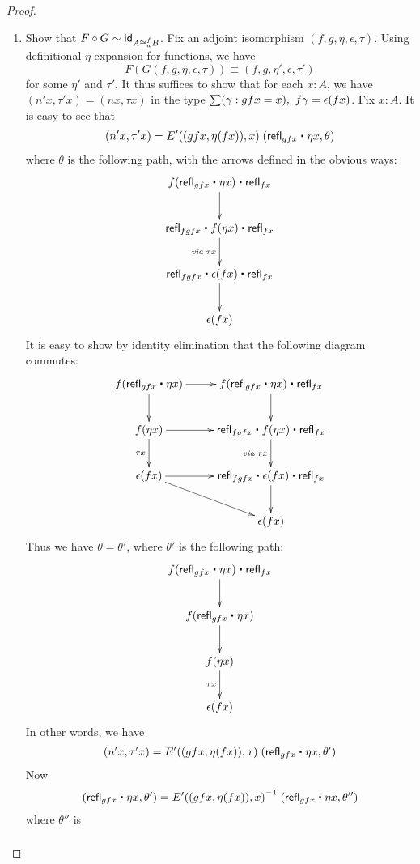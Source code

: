\begin{proof}
\begin{description}
\begin{enumerate}
\item Show that $F \circ G \sim \idfunc[A \cong_a^f B]$. Fix an adjoint isomorphism $(f,g,\eta,\epsilon,\tau)$. Using definitional $\eta$-expansion for functions, we have \[F(G(f,g,\eta,\epsilon,\tau)) \equiv (f, g, \eta', \epsilon, \tau')\] for some $\eta'$ and $\tau'$. It thus suffices to show that for each $x : A$, we have $(n'x,\tau' x) = (nx,\tau x)$ in the type $\sm{\gamma : gfx = x} f\gamma = \epsilon(fx)$. Fix $x : A$. It is easy to see that
\begin{align*}
(n'x,\tau' x) = E'((gfx, \eta(fx)),x) \; (\refl{gfx} \ct \eta x, \theta)
\end{align*}
where $\theta$ is the following path, with the arrows defined in the obvious ways:
\begin{align*}
\xymatrix{
f(\refl{gfx} \ct \eta x) \ct \refl{fx} \ar[d] \\
\refl{fgfx} \ct f(\eta x) \ct \refl{fx} \ar[d]_{\mathit{via \;}\tau x} \\
\refl{fgfx} \ct \epsilon (fx) \ct \refl{fx} \ar[d] \\
\epsilon (f x)}
\end{align*}
It is easy to show by identity elimination that the following diagram commutes:
\begin{align*}
\xymatrix{
f(\refl{gfx} \ct \eta x) \ar[r] \ar[d] & f(\refl{gfx} \ct \eta x) \ct \refl{fx} \ar[d] \\
f(\eta x) \ar[r] \ar[d]_{\tau x} & \refl{fgfx} \ct f(\eta x) \ct \refl{fx} \ar[d]_{\mathit{via \;}\tau x} \\
\epsilon (f x) \ar[r] \ar[rd] & \refl{fgfx} \ct \epsilon (fx) \ct \refl{fx} \ar[d] \\
& \epsilon (f x)}
\end{align*}
Thus we have $\theta = \theta'$, where $\theta'$ is the following path:
\begin{align*}
\xymatrix{
f(\refl{gfx} \ct \eta x) \ct \refl{fx} \ar[d] \\
f(\refl{gfx} \ct \eta x) \ar[d] \\
f(\eta x) \ar[d] _{\tau x} \\
\epsilon (f x)}
\end{align*}
In other words, we have  
\begin{align*}
(n'x,\tau' x) = E'((gfx, \eta(fx)),x) \; (\refl{gfx} \ct \eta x, \theta')
\end{align*}
Now \[(\refl{gfx} \ct \eta x, \theta') = \opp{E'((gfx, \eta(fx)),x)} \; (\refl{gfx} \ct \eta x, \theta'')\] where $\theta''$ is
\begin{align*}

\end{align*}
\end{enumerate}
\end{description}
\end{proof}
